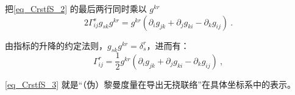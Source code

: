 把\autoref{eq_CrstfS_2} 的最后两行同时乘以 $g^{kr}$
\begin{equation}
2\Gamma^{s}_{ij}g_{sk}g^{kr}=g^{kr}(\partial_ig_{jk}+\partial_jg_{ki}-\partial_kg_{ij})~.
\end{equation}

由指标的升降的约定法则，$g_{sk}g^{kr}=\delta_s^r$，进而有：
\begin{equation}\label{eq_CrstfS_3}
\Gamma^{r}_{ij}=\frac{1}{2}g^{kr}(\partial_ig_{jk}+\partial_jg_{ki}-\partial_kg_{ij})~,
\end{equation}

\autoref{eq_CrstfS_3} 就是“（伪）黎曼度量在导出无挠联络”在具体坐标系中的表示。






